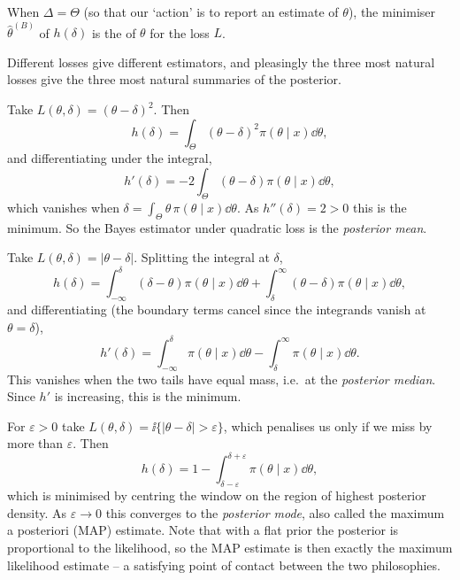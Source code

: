\documentclass[a4paper]{scrartcl}
\begin{document}
\begin{definition}
  When $\Delta = \Theta$ (so that our `action' is to report an estimate of $\theta$), the minimiser $\hat\theta^{(B)}$ of $h(\delta)$ is the  of $\theta$ for the loss $L$.
\end{definition}

Different losses give different estimators, and pleasingly the three most natural losses give the three most natural summaries of the posterior.

\begin{example}
  Take $L(\theta,\delta) = (\theta - \delta)^2$. Then
  $$
  h(\delta) = \int_\Theta (\theta-\delta)^2 \pi(\theta\mid x)\dd\theta,
  $$
  and differentiating under the integral,
  $$
  h'(\delta) = -2\int_\Theta(\theta - \delta)\pi(\theta\mid x)\dd\theta,
  $$
  which vanishes when $\delta = \int_\Theta \theta\, \pi(\theta\mid x)\dd\theta$. As $h''(\delta) = 2 > 0$ this is the minimum. So the Bayes estimator under quadratic loss is the \emph{posterior mean}.
\end{example}

\begin{example}
  Take $L(\theta,\delta) = |\theta - \delta|$. Splitting the integral at $\delta$,
  $$
  h(\delta) = \int_{-\infty}^{\delta}(\delta - \theta)\pi(\theta\mid x)\dd\theta + \int_{\delta}^{\infty}(\theta - \delta)\pi(\theta\mid x)\dd\theta,
  $$
  and differentiating (the boundary terms cancel since the integrands vanish at $\theta = \delta$),
  $$
  h'(\delta) = \int_{-\infty}^{\delta}\pi(\theta\mid x)\dd\theta - \int_{\delta}^{\infty}\pi(\theta\mid x)\dd\theta.
  $$
  This vanishes when the two tails have equal mass, i.e.\ at the \emph{posterior median}. Since $h'$ is increasing, this is the minimum.
\end{example}

\begin{example}
  For $\varepsilon > 0$ take $L(\theta,\delta) = \ii\{|\theta - \delta| > \varepsilon\}$, which penalises us only if we miss by more than $\varepsilon$. Then
  $$
  h(\delta) = 1 - \int_{\delta - \varepsilon}^{\delta+\varepsilon}\pi(\theta\mid x)\dd\theta,
  $$
  which is minimised by centring the window on the region of highest posterior density. As $\varepsilon \to 0$ this converges to the \emph{posterior mode}, also called the maximum a posteriori (MAP) estimate. Note that with a flat prior the posterior is proportional to the likelihood, so the MAP estimate is then exactly the maximum likelihood estimate -- a satisfying point of contact between the two philosophies.
\end{example}
\end{document}
